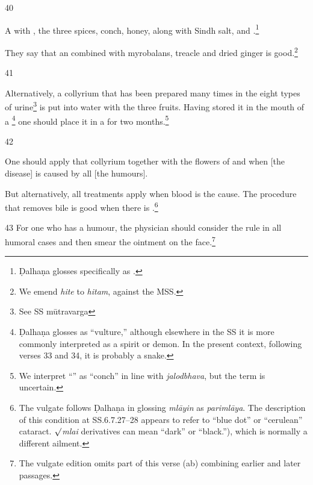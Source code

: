 \begin{translation}
    \item[40] %
    
    A  with 
    , the three spices, conch, honey, along with Sindh salt, 
     and .\footnote{Ḍalhaṇa 
    glosses   specifically as  
    \citep[629]{vulgate}.}
    
    They say that an 
     combined with 
    myrobalans, 
    treacle and 
    dried ginger
    is good.\footnote{We emend \emph{hite} to \emph{hitam}, against the MSS.}
    
    \item[41]
    
    Alternatively, a collyrium that has been prepared many times in the eight types of
    urine\footnote{See SS mūtravarga} is put into water with the three 
    fruits. Having
    stored it in the mouth of a \footnote{Ḍalhaṇa
    glosses  as “vulture,” although elsewhere in the
    SS it is more commonly interpreted as a spirit or demon.  In the present context, 
    following verses 33 and 34, it is probably a snake.} one should place it in a
     for two months.\footnote{We interpret
    “” as “conch” in line with \emph{jalodbhava}, but the
    term is uncertain.}
    
    
    \item[42]
    
    One should apply that collyrium 
    together with the flowers of
    and
    when [the disease] is caused by all [the humours].
    
    But alternatively, all treatments apply when blood is the cause.  The procedure
    that removes bile is good when there is .\footnote{The vulgate follows Ḍalhaṇa in glossing \emph{mlāyin} as
    \emph{parimlāya}.  The description of this condition at SS.6.7.27--28 appears to
    refer to “blue dot” or “cerulean” cataract.  \emph{$\surd$mlai} derivatives can 
    mean “dark” or “black.”), which is normally a different ailment.}
    
    \item[43] For one who has a humour, the physician should consider the rule in
    all humoral cases and then smear the ointment on the face.\footnote{The vulgate
    edition omits part of this verse (ab) combining earlier and later passages.}
    

\end{translation}

